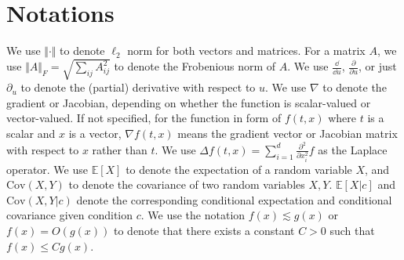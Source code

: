 \section*{Notations}

We use $\Vert\cdot\Vert$ to denote $\ell_2$ norm for both vectors and matrices. For a matrix $A$, we use $\Vert A\Vert_F=\sqrt{\sum_{ij}A_{ij}^2}$ to denote the Frobenious norm of $A$. We use $\frac{\dd}{\dd u}$, $\frac{\partial}{\partial u}$, or just $\partial_u$ to denote the (partial) derivative with respect to $u$. We use $\nabla$ to denote the gradient or Jacobian, depending on whether the function is scalar-valued or vector-valued. If not specified, for the function in form of $f(t,x)$ where $t$ is a scalar and $x$ is a vector, $\nabla f(t,x)$ means the gradient vector or Jacobian matrix with respect to $x$ rather than $t$. We use $\Delta f(t,x)=\sum_{i=1}^d\frac{\partial^2}{\partial x_i^2}f$ as the Laplace operator. We use $\mathbb{E}[X]$ to denote the expectation of a random variable $X$, and $\text{Cov}(X,Y)$ to denote the covariance of two random variables $X,Y$. $\mathbb{E}[X|c]$ and $\text{Cov}(X,Y|c)$ denote the corresponding conditional expectation and conditional covariance given condition $c$. We use the notation $f(x)\lesssim g(x)$ or $f(x)=O(g(x))$ to denote that there exists a constant $C>0$ such that $f(x)\le Cg(x)$.

